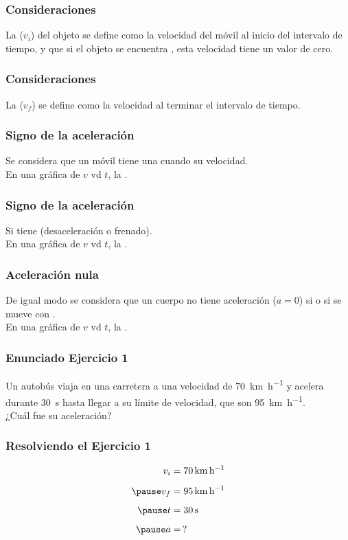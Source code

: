 \documentclass[14pt]{beamer}
\begin{document}
\begin{frame}
\frametitle{Consideraciones}
La  ($v_{i}$) del objeto se define como la velocidad del móvil al inicio del intervalo de tiempo, \pause y que si el objeto se encuentra , esta velocidad tiene un valor de cero.
\end{frame}
\begin{frame}
\frametitle{Consideraciones}
La  ($v_{f}$) se define como la velocidad al terminar el intervalo de tiempo.
\end{frame}
\begin{frame}
\frametitle{Signo de la aceleración}
Se considera que un móvil tiene una  \pause cuando  su velocidad.
\\
\bigskip
\pause
En una gráfica de $v$ vd $t$, la .
\end{frame}
\begin{frame}
\frametitle{Signo de la aceleración}
Si  \pause  tiene  (desaceleración o frenado).
\\
\bigskip
\pause
En una gráfica de $v$ vd $t$, la .
\end{frame}
\begin{frame}
\frametitle{Aceleración nula}
De igual modo se considera que un cuerpo no tiene aceleración ($a = 0$) \pause si  \pause o si se mueve con .
\\
\bigskip
\pause
En una gráfica de $v$ vd $t$, la .
\end{frame}
\begin{frame}
\frametitle{Enunciado Ejercicio 1}
Un autobús viaja en una carretera a una velocidad de \SI{70}{\kilo\meter\per\hour} y acelera durante \SI{30}{\second} hasta llegar a su límite de velocidad, que son \SI{95}{\kilo\meter\per\hour}.
\\
\bigskip
\pause
¿Cuál fue su aceleración?
\end{frame}
\begin{frame}
\frametitle{Resolviendo el Ejercicio 1}
\pause
\begin{eqnarray*}
\begin{aligned}
v_{i} &= \SI{70}{\kilo\meter\per\hour} \\[0.5em] \pause
v_{f} &= \SI{95}{\kilo\meter\per\hour} \\[0.5em] \pause
t &= \SI{30}{\second} \\[0.5em] \pause
a &= \, ?
\end{aligned}
\end{eqnarray*}
\end{frame}
\end{document}
